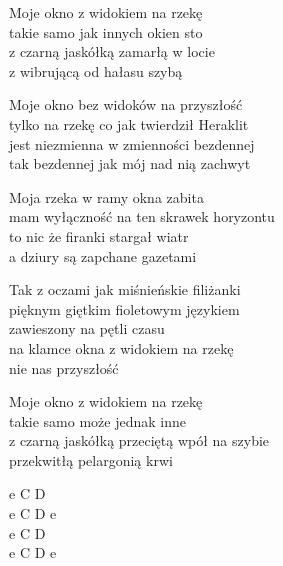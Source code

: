 \begin{text}
    Moje okno z widokiem na rzekę\\
    takie samo jak innych okien sto\\
    z czarną jaskółką zamarłą w locie\\
    z wibrującą od hałasu szybą

    Moje okno bez widoków na przyszłość\\
    tylko na rzekę co jak twierdził Heraklit\\
    jest niezmienna w zmienności bezdennej\\
    tak bezdennej jak mój nad nią zachwyt

    Moja rzeka w ramy okna zabita\\
    mam wyłączność na ten skrawek horyzontu\\
    to nic że firanki stargał wiatr\\
    a dziury są zapchane gazetami

    Tak z oczami jak miśnieńskie filiżanki\\
    pięknym giętkim fioletowym językiem\\
    zawieszony na pętli czasu\\
    na klamce okna z widokiem na rzekę\\
    nie nas przyszłość

    Moje okno z widokiem na rzekę\\
    takie samo może jednak inne\\
    z czarną jaskółką przeciętą wpół na szybie\\
    przekwitłą pelargonią krwi
\end{text}
\begin{chord}
    e C D\\
    e C D e\\
    e C D\\
    e C D e
\end{chord}